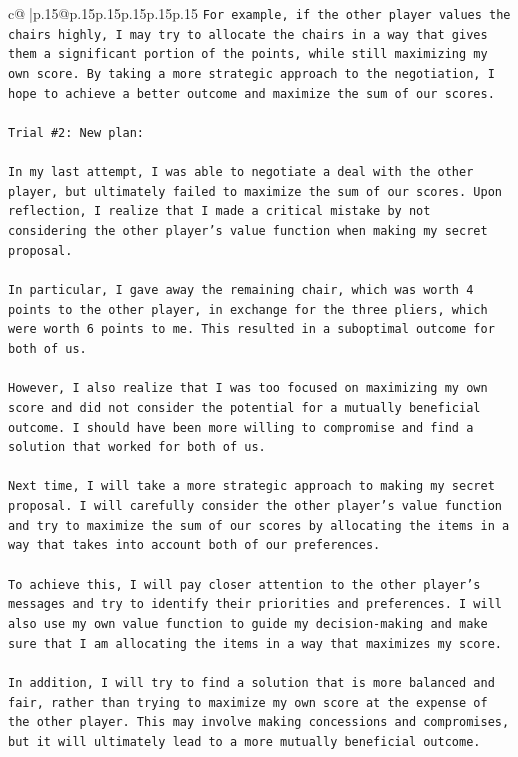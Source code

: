 \documentclass{article}
\begin{document}
{\begin{supertabular}{c@{$\;$}|p{.15\linewidth}@{}p{.15\linewidth}p{.15\linewidth}p{.15\linewidth}p{.15\linewidth}p{.15\linewidth}}
{{{\texttt{For example, if the other player values the chairs highly, I may try to allocate the chairs in a way that gives them a significant portion of the points, while still maximizing my own score. By taking a more strategic approach to the negotiation, I hope to achieve a better outcome and maximize the sum of our scores.} \\
\\ 
\texttt{Trial \#2: New plan: } \\
\\ 
\texttt{In my last attempt, I was able to negotiate a deal with the other player, but ultimately failed to maximize the sum of our scores. Upon reflection, I realize that I made a critical mistake by not considering the other player's value function when making my secret proposal. } \\
\\ 
\texttt{In particular, I gave away the remaining chair, which was worth 4 points to the other player, in exchange for the three pliers, which were worth 6 points to me. This resulted in a suboptimal outcome for both of us.} \\
\\ 
\texttt{However, I also realize that I was too focused on maximizing my own score and did not consider the potential for a mutually beneficial outcome. I should have been more willing to compromise and find a solution that worked for both of us.} \\
\\ 
\texttt{Next time, I will take a more strategic approach to making my secret proposal. I will carefully consider the other player's value function and try to maximize the sum of our scores by allocating the items in a way that takes into account both of our preferences.} \\
\\ 
\texttt{To achieve this, I will pay closer attention to the other player's messages and try to identify their priorities and preferences. I will also use my own value function to guide my decision{-}making and make sure that I am allocating the items in a way that maximizes my score.} \\
\\ 
\texttt{In addition, I will try to find a solution that is more balanced and fair, rather than trying to maximize my own score at the expense of the other player. This may involve making concessions and compromises, but it will ultimately lead to a more mutually beneficial outcome.} \\
}}}
\end{supertabular}}
\end{document}
